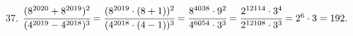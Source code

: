 37. $\cfrac{(8^{2020}+8^{2019})^2}{(4^{2019}-4^{2018})^3}=\cfrac{(8^{2019}\cdot(8+1))^2}{(4^{2018}\cdot(4-1))^3}=
\cfrac{8^{4038}\cdot9^2}{4^{6054}\cdot3^3}=\cfrac{2^{12114}\cdot3^4}{2^{12108}\cdot3^3}=2^6\cdot3=192.$\\
